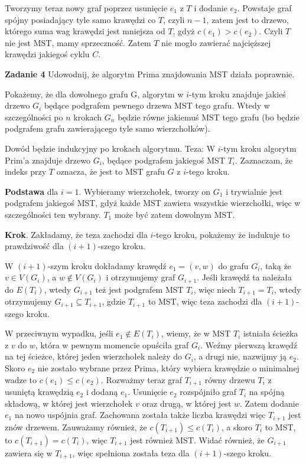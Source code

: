 \documentclass[12pt,a4paper]{article}
\begin{document}
Tworzymy teraz  nowy graf poprzez usunięcie \( e_1 \) z \(T\) i dodanie \(e_2\). Powstaje graf spójny posiadający tyle samo krawędzi co \(T\), czyli \( n - 1\), zatem jest to drzewo, którego suma wag krawędzi jest mniejsza od \(T\), gdyż \( c(e_1) > c(e_2) \). Czyli \(T\) nie jest MST, mamy sprzeczność. Zatem \(T\) nie mogło zawierać najcięższej krawędzi jakiegoś cyklu \(C\). 

\newpage
\noindent
\textbf{Zadanie 4} Udowodnij, że algorytm Prima znajdowania MST działa poprawnie.
\vskip 0.5cm

Pokażemy, że dla dowolnego grafu G, algorytm w \(i\)-tym kroku znajduje jakieś drzewo \(G_i\) będące podgrafem pewnego drzewa MST tego grafu. Wtedy w szczególności po \(n\) krokach \( G_n \) będzie równe jakiemuś MST tego grafu (bo będzie podgrafem grafu zawierającego tyle samo wierzchołków).

Dowód będzie indukcyjny po krokach algorytmu. Teza: W \(i\)-tym kroku algorytm Prim'a znajduje drzewo \(G_i\), będące podgrafem jakiegoś MST \(T_i\). Zaznaczam, że indeks przy \(T\) oznacza, że jest to MST grafu \(G\) z \(i\)-tego kroku. 

\textbf{Podstawa} dla \( i = 1 \). Wybieramy wierzchołek, tworzy on \(G_1\) i trywialnie jest podgrafem jakiegoś MST, gdyż każde MST zawiera wszystkie wierzchołki, więc w szczególności ten wybrany. \(T_1\) może być zatem dowolnym MST.

\textbf{Krok}. Zakładamy, że teza zachodzi dla \(i\)-tego kroku, pokażemy że indukuje to prawdziwość dla \( (i+1) \)-szego kroku.

W \( (i+1) \)-szym kroku dokładamy krawędź \(e_1 = (v,w)\) do grafu \(G_i\), taką że \(v \in V(G_i) \), a \(w \notin V(G_i)\) i otrzymujemy graf \(G_{i+1} \). Jeśli krawędź ta należała do \( E(T_i) \), wtedy \(G_{i+1}\) też jest podgrafem MST \(T_i\), więc niech \(T_{i+1} = T_i\), wtedy otrzymujemy \(G_{i+1} \subseteq T_{i+1} \), gdzie \(T_{i+1} \) to MST, więc teza zachodzi dla \( (i+1) \)-szego kroku.

W przeciwnym wypadku, jeśli \( e_1 \notin E(T_i)\), wiemy, że w MST \(T_i\) istniała ścieżka z \(v\) do \(w\), która w pewnym momencie opuściła graf \(G_i\). Weźmy pierwszą krawędź na tej ścieżce, której jeden wierzchołek należy do \(G_i\), a drugi nie, nazwijmy ją \(e_2\). Skoro \(e_2\) nie zostało wybrane przez Prima, który wybiera krawędzie o minimalnej wadze to \(c(e_1) \leq c(e_2) \). Rozważmy teraz graf \( T_{i+1} \) równy drzewu \(T_i\) z usuniętą krawędzią \(e_2\) i dodaną \(e_1\). Usunięcie \(e_2\) rozspójniło graf \(T_i\) na spójną składową, w której jest wierzchołek \(v\) oraz drugą, w której jest \(w\). Zatem dodanie \(e_1\) na nowo uspójnia graf. Zachowana została także liczba krawędzi więc \(T_{i+1}\) jest znów drzewem. Zauważamy również, że \(c(T_{i+1}) \leq c(T_i)\), a skoro \( T_i \) to MST, to \( c(T_{i+1}) = c(T_i) \), więc \(T_{i+1}\) jest również MST. Widać również, że \(G_{i+1}\) zawiera się w \(T_{i+1}\), więc spełniona została teza dla \( (i+1) \)-szego kroku.
\end{document}
